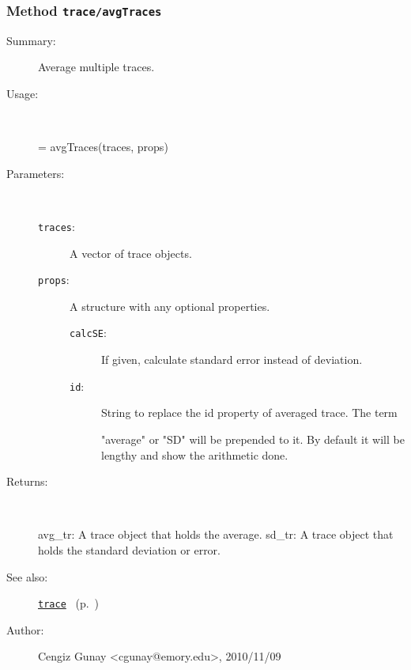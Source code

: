 \subsubsection[Method \texttt{avgTraces}]{Method \texttt{trace/avgTraces}}%
%
\label{ref_trace__avgTraces}%
\hypertarget{ref_trace__avgTraces}{}%
\begin{description}
\item[Summary:]Average multiple traces.
%
\item[Usage:]~%
\begin{lyxcode}%
[avg\_tr sd\_tr] = avgTraces(traces, props)
%
\end{lyxcode}%
%
%
\item[Parameters:]~
\begin{description}%
\item[\texttt{traces}:]
 A vector of trace objects.
\item[\texttt{props}:]
 A structure with any optional properties.
\begin{description}%
\item[\texttt{calcSE}:]
 If given, calculate standard error instead of deviation.
\item[\texttt{id}:]
 String to replace the id property of averaged trace. The term

"average" or "SD" will be prepended to it.  By default
it will be lengthy and show the arithmetic done.
\end{description}%
\end{description}%
%
\item[Returns:
]~

	avg\_tr: A trace object that holds the average.
	sd\_tr: A trace object that holds the standard deviation or error.
%
%
\item[See also:]%
\hyperlink{ref_trace}{\texttt{trace}}%
\ (p.~\pageref{ref_trace})%
%
%
\item[Author:]%
Cengiz Gunay <cgunay@emory.edu>, 2010/11/09
%
\end{description}
\methodline%
